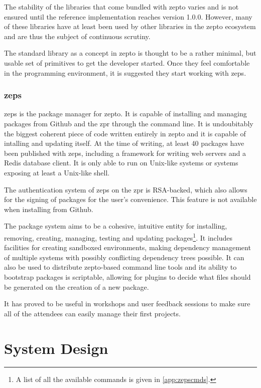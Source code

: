 \documentclass[oneside,11pt,xetex]{scrbook}
\begin{document}
The stability of the libraries that come bundled with zepto varies and is not
ensured until the reference implementation reaches version 1.0.0. However, many
of these libraries have at least been used by other libraries in the zepto
ecosystem and are thus the subject of continuous scrutiny.

The standard library as a concept in zepto is thought to be a rather minimal,
but usable set of primitives to get the developer started. Once they feel
comfortable in the programming environment, it is suggested they start working
with \gls{zeps}.

\subsection{\gls{zeps}}

\gls{zeps} is the package manager for zepto. It is capable of installing and
managing packages from Github and the \gls{zpr} through the command line. It
is undoubitably the biggest coherent piece of code written entirely in zepto
and it is capable of intalling and updating itself. At the time of writing,
at least 40 packages have been published with \gls{zeps}, including a framework
for writing web servers and a Redis database client. It is only able to run
on Unix-like systems or systems exposing at least a Unix-like shell.

The authentication system of \gls{zeps} on the \gls{zpr} is RSA-backed, which
also allows for the signing of packages for the user's convenience. This feature
is not available when installing from Github.

The package system aims to be a cohesive, intuitive entity for installing,
removing, creating, managing, testing and updating packages\footnote{A list of
all the available commands is given in \ref{app:zepscmds}.}. It includes
facilities for creating sandboxed environments, making dependency management
of multiple systems with possibly conflicting dependency trees possible.
It can also be used to distribute zepto-based command line tools and its
ability to bootstrap packages is scriptable, allowing for plugins to
decide what files should be generated on the creation of a new package.

It has proved to be useful in workshops and user feedback sessions to make
sure all of the attendees can easily manage their first projects.

\chapter{System Design}
\label{chap:SystemDesign}
\end{document}
